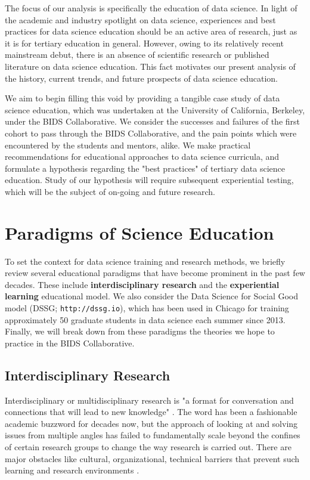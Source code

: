 \documentclass{sig-alternate}
\begin{document}
The focus of our analysis is specifically the education of data science. In light of the academic and industry spotlight on data science, experiences and best practices for data science education should be an active area of research, just as it is for tertiary education in general.  However, owing to its relatively recent mainstream debut, there is an absence of scientific research or published literature on data science education.  This fact motivates our present analysis of the history, current trends, and future prospects of data science education.

We aim to begin filling this void by providing a tangible case study of data science education, which was undertaken at the University of California, Berkeley, under the BIDS Collaborative. We consider the successes and failures of the first cohort to pass through the BIDS Collaborative, and the pain points which were encountered by the students and mentors, alike.  We make practical recommendations for educational approaches to data science curricula, and formulate a hypothesis regarding the "best practices" of tertiary data science education.  Study of our hypothesis will require subsequent experiential testing, which will be the subject of on-going and future research.



\section{Paradigms of Science Education}

To set the context for data science training and research methods, we briefly review several educational paradigms that have become prominent in the past few decades. These include \textbf{interdisciplinary research} and the \textbf{experiential learning} educational model. We also consider the Data Science for Social Good model (DSSG; \texttt{http://dssg.io}), which has been used in Chicago for training approximately 50 graduate students in data science each summer since 2013. Finally, we will break down from these paradigms the theories we hope to practice in the BIDS Collaborative.

\subsection{Interdisciplinary Research}

Interdisciplinary or multidisciplinary research is "a format for conversation and connections that will lead to new knowledge" \cite{repko2008interdisciplinary}. The word has been a fashionable academic buzzword for decades now, but the approach of looking at and solving issues from multiple angles has failed to fundamentally scale beyond the confines of certain research groups to change the way research is carried out. There are major obstacles like cultural, organizational, technical barriers that prevent such learning and research environments \cite{eisenberg2000bridging}.
\end{document}
